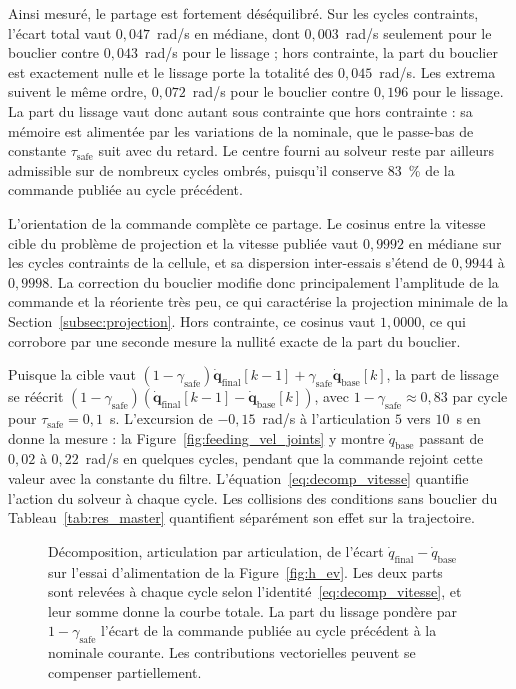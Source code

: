 Ainsi mesuré, le partage est fortement déséquilibré. Sur les cycles contraints, l'écart total vaut $0{,}047$~rad/s en médiane, dont $0{,}003$~rad/s seulement pour le bouclier contre $0{,}043$~rad/s pour le lissage ; hors contrainte, la part du bouclier est exactement nulle et le lissage porte la totalité des $0{,}045$~rad/s. Les extrema suivent le même ordre, $0{,}072$~rad/s pour le bouclier contre $0{,}196$ pour le lissage. La part du lissage vaut donc autant sous contrainte que hors contrainte : sa mémoire est alimentée par les variations de la nominale, que le passe-bas de constante $\tau_{\mathrm{safe}}$ suit avec du retard. Le centre fourni au solveur reste par ailleurs admissible sur de nombreux cycles ombrés, puisqu'il conserve $83$~\% de la commande publiée au cycle précédent.

L'orientation de la commande complète ce partage. Le cosinus entre la vitesse cible du problème de projection et la vitesse publiée vaut $0{,}9992$ en médiane sur les cycles contraints de la cellule, et sa dispersion inter-essais s'étend de $0{,}9944$ à $0{,}9998$. La correction du bouclier modifie donc principalement l'amplitude de la commande et la réoriente très peu, ce qui caractérise la projection minimale de la Section~\ref{subsec:projection}. Hors contrainte, ce cosinus vaut $1{,}0000$, ce qui corrobore par une seconde mesure la nullité exacte de la part du bouclier.

Puisque la cible vaut $(1-\gamma_{\mathrm{safe}})\dot{\mathbf{q}}_{\mathrm{final}}[k-1] + \gamma_{\mathrm{safe}}\dot{\mathbf{q}}_{\mathrm{base}}[k]$, la part de lissage se réécrit $(1-\gamma_{\mathrm{safe}})(\dot{\mathbf{q}}_{\mathrm{final}}[k-1] - \dot{\mathbf{q}}_{\mathrm{base}}[k])$, avec $1-\gamma_{\mathrm{safe}} \approx 0{,}83$ par cycle pour $\tau_{\mathrm{safe}} = 0{,}1$~s. L'excursion de $-0{,}15$~rad/s à l'articulation $5$ vers $10$~s en donne la mesure : la Figure~\ref{fig:feeding_vel_joints} y montre $\dot{q}_{\mathrm{base}}$ passant de $0{,}02$ à $0{,}22$~rad/s en quelques cycles, pendant que la commande rejoint cette valeur avec la constante du filtre. L'équation~\eqref{eq:decomp_vitesse} quantifie l'action du solveur à chaque cycle. Les collisions des conditions sans bouclier du Tableau~\ref{tab:res_master} quantifient séparément son effet sur la trajectoire.

\begin{figure}[!htbp]
    \centering
    
    \caption[Décomposition de la correction de vitesse (alimentation)]{Décomposition, articulation par articulation, de l'écart $\dot{q}_{\mathrm{final}}-\dot{q}_{\mathrm{base}}$ sur l'essai d'alimentation de la Figure~\ref{fig:h_ev}. Les deux parts sont relevées à chaque cycle selon l'identité~\eqref{eq:decomp_vitesse}, et leur somme donne la courbe totale. La part du lissage pondère par $1-\gamma_{\mathrm{safe}}$ l'écart de la commande publiée au cycle précédent à la nominale courante. Les contributions vectorielles peuvent se compenser partiellement.}\label{fig:feeding_vel_decomp}
\end{figure}

